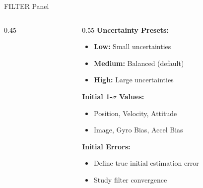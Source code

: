 \documentclass{beamer}
\begin{document}
\begin{frame}{FILTER Panel}
\begin{columns}
\begin{column}{0.45\textwidth}
\end{column}

\begin{column}{0.55\textwidth}
\textbf{Uncertainty Presets:}
\begin{itemize}
    \item \textbf{Low:} Small uncertainties
    \item \textbf{Medium:} Balanced (default)
    \item \textbf{High:} Large uncertainties
\end{itemize}

\vspace{0.3cm}
\textbf{Initial 1-$\sigma$ Values:}
\begin{itemize}
    \item Position, Velocity, Attitude
    \item Image, Gyro Bias, Accel Bias
\end{itemize}

\vspace{0.3cm}
\textbf{Initial Errors:}
\begin{itemize}
    \item Define true initial estimation error
    \item Study filter convergence
\end{itemize}
\end{column}
\end{columns}
\end{frame}
\end{document}
